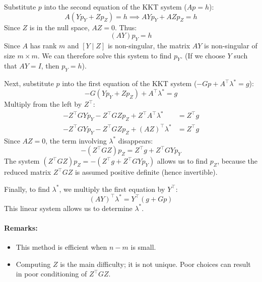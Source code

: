 Substitute $p$ into the second equation of the KKT system ($Ap = h$):
\begin{equation}
    A(Y p_Y + Z p_Z) = h \implies AY p_Y + AZ p_Z = h
\end{equation}
Since $Z$ is in the null space, $AZ = 0$. Thus:
\begin{equation}
    (AY) p_Y = h
\end{equation}
Since $A$ has rank $m$ and $[Y \mid Z]$ is non-singular, the matrix $AY$ is non-singular of size $m \times m$.
We can therefore solve this system to find $p_Y$. (If we choose $Y$ such that $AY=I$, then $p_Y = h$).

Next, substitute $p$ into the first equation of the KKT system ($ -Gp + A^\top \lambda^* = g $):
\begin{equation}
    -G(Y p_Y + Z p_Z) + A^\top \lambda^* = g
\end{equation}
Multiply from the left by $Z^\top$:
\begin{align*}
    -Z^\top G Y p_Y - Z^\top G Z p_Z + Z^\top A^\top \lambda^* &= Z^\top g \\
    -Z^\top G Y p_Y - Z^\top G Z p_Z + (AZ)^\top \lambda^* &= Z^\top g
\end{align*}
Since $AZ=0$, the term involving $\lambda^*$ disappears:
\begin{equation}
    -(Z^\top G Z) p_Z = Z^\top g + Z^\top G Y p_Y
\end{equation}
The system $(Z^\top G Z) p_Z = -(Z^\top g + Z^\top G Y p_Y)$ allows us to find $p_Z$, because the reduced matrix $Z^\top G Z$ is assumed positive definite (hence invertible).

Finally, to find $\lambda^*$, we multiply the first equation by $Y^\top$:
\begin{equation}
    (AY)^\top \lambda^* = Y^\top (g + Gp)
\end{equation}
This linear system allows us to determine $\lambda^*$.

\paragraph{Remarks:}
\begin{itemize}
    \item This method is efficient when $n-m$ is small.
    \item Computing $Z$ is the main difficulty; it is not unique. Poor choices can result in poor conditioning of $Z^\top G Z$.
\end{itemize}

